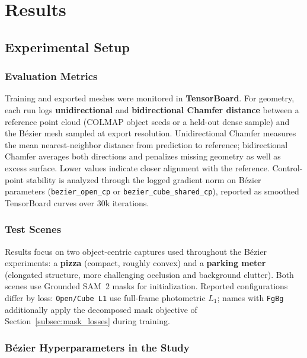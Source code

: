 ﻿\chapter{Results}
\label{chap:results}

\section{Experimental Setup}
\label{sec:results_setup}

\subsection{Evaluation Metrics}
\label{subsec:eval_metrics}

Training and exported meshes were monitored in \textbf{TensorBoard}. For geometry, each run logs \textbf{unidirectional} and \textbf{bidirectional Chamfer distance} between a reference point cloud (COLMAP object seeds or a held-out dense sample) and the B\'ezier mesh sampled at export resolution. Unidirectional Chamfer measures the mean nearest-neighbor distance from prediction to reference; bidirectional Chamfer averages both directions and penalizes missing geometry as well as excess surface. Lower values indicate closer alignment with the reference. Control-point stability is analyzed through the logged gradient norm on B\'ezier parameters (\texttt{bezier\_open\_cp} or \texttt{bezier\_cube\_shared\_cp}), reported as smoothed TensorBoard curves over 30k iterations.

\subsection{Test Scenes}
\label{subsec:test_scenes}

Results focus on two object-centric captures used throughout the B\'ezier experiments: a \textbf{pizza} (compact, roughly convex) and a \textbf{parking meter} (elongated structure, more challenging occlusion and background clutter). Both scenes use Grounded SAM~2 masks for initialization. Reported configurations differ by loss: \texttt{Open/Cube L1} use full-frame photometric $L_1$; names with \texttt{FgBg} additionally apply the decomposed mask objective of Section~\ref{subsec:mask_losses} during training.

\subsection{B\'ezier Hyperparameters in the Study}
\label{subsec:bezier_study_hparams}

